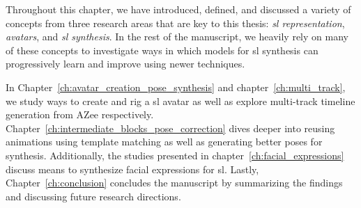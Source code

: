 \documentclass[../../main.tex]{subfiles}
\begin{document}
Throughout this chapter, we have introduced, defined, and discussed a variety of concepts from three research areas that are key to this thesis: \textit{\gls{sl} representation}, \textit{avatars}, and \textit{\gls{sl} synthesis}. In the rest of the manuscript, we heavily rely on many of these concepts to investigate ways in which models for \gls{sl} synthesis can progressively learn and improve using newer techniques.

In Chapter~\ref{ch:avatar_creation_pose_synthesis} and chapter~\ref{ch:multi_track}, we study ways to create and rig a \gls{sl} avatar as well as explore multi-track timeline generation from AZee respectively. Chapter~\ref{ch:intermediate_blocks_pose_correction} dives deeper into reusing animations using template matching as well as generating better poses for synthesis. Additionally, the studies presented in chapter~\ref{ch:facial_expressions} discuss means to synthesize facial expressions for \gls{sl}. Lastly, Chapter~\ref{ch:conclusion} concludes the manuscript by summarizing the findings and discussing future research directions.
\end{document}
